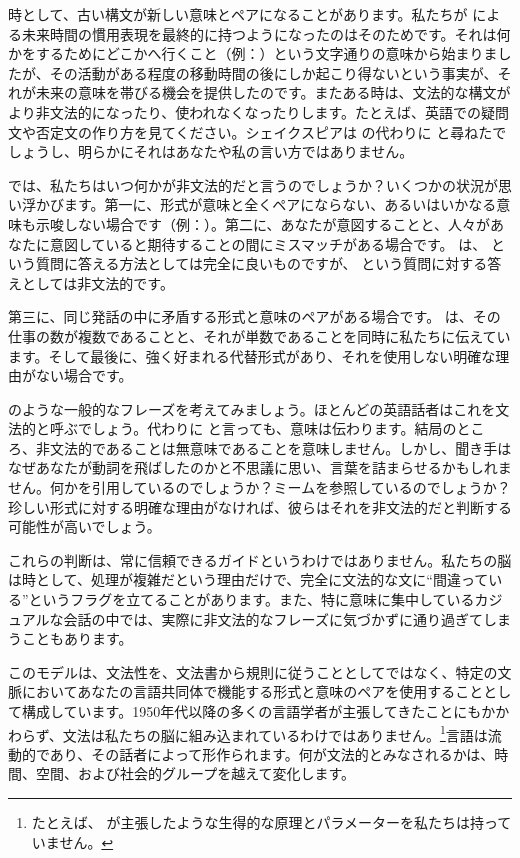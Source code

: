 時として、古い構文が新しい意味とペアになることがあります。私たちが  による未来時間の慣用表現を最終的に持つようになったのはそのためです。それは何かをするためにどこかへ行くこと（例：）という文字通りの意味から始まりましたが、その活動がある程度の移動時間の後にしか起こり得ないという事実が、それが未来の意味を帯びる機会を提供したのです。またある時は、文法的な構文がより非文法的になったり、使われなくなったりします。たとえば、英語での疑問文や否定文の作り方を見てください。シェイクスピアは  の代わりに  と尋ねたでしょうし、明らかにそれはあなたや私の言い方ではありません。



では、私たちはいつ何かが非文法的だと言うのでしょうか？いくつかの状況が思い浮かびます。第一に、形式が意味と全くペアにならない、あるいはいかなる意味も示唆しない場合です（例：）。第二に、あなたが意図することと、人々があなたに意図していると期待することの間にミスマッチがある場合です。 は、 という質問に答える方法としては完全に良いものですが、 という質問に対する答えとしては非文法的です。


第三に、同じ発話の中に矛盾する形式と意味のペアがある場合です。 は、その仕事の数が複数であることと、それが単数であることを同時に私たちに伝えています。そして最後に、強く好まれる代替形式があり、それを使用しない明確な理由がない場合です。

 のような一般的なフレーズを考えてみましょう。ほとんどの英語話者はこれを文法的と呼ぶでしょう。代わりに  と言っても、意味は伝わります。結局のところ、非文法的であることは無意味であることを意味しません。しかし、聞き手はなぜあなたが動詞を飛ばしたのかと不思議に思い、言葉を詰まらせるかもしれません。何かを引用しているのでしょうか？ミームを参照しているのでしょうか？珍しい形式に対する明確な理由がなければ、彼らはそれを非文法的だと判断する可能性が高いでしょう。

これらの判断は、常に信頼できるガイドというわけではありません。私たちの脳は時として、処理が複雑だという理由だけで、完全に文法的な文に\enquote{間違っている}というフラグを立てることがあります。また、特に意味に集中しているカジュアルな会話の中では、実際に非文法的なフレーズに気づかずに通り過ぎてしまうこともあります。

このモデルは、文法性を、文法書から規則に従うこととしてではなく、特定の文脈においてあなたの言語共同体で機能する形式と意味のペアを使用することとして構成しています。1950年代以降の多くの言語学者が主張してきたことにもかかわらず、文法は私たちの脳に組み込まれているわけではありません。\footnote{たとえば、\citet{chomsky1981lectures} が主張したような生得的な原理とパラメーターを私たちは持っていません。}言語は流動的であり、その話者によって形作られます。何が文法的とみなされるかは、時間、空間、および社会的グループを越えて変化します。

